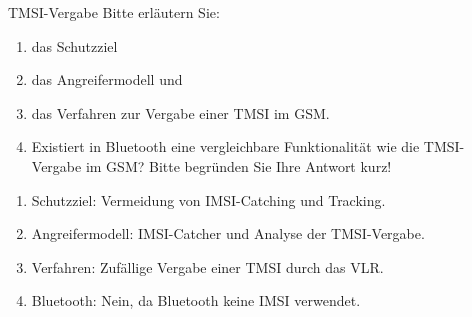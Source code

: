\documentclass{article}
\begin{document}
\begin{exercise}{TMSI-Vergabe}
  Bitte erläutern Sie:
  \begin{enumerate}
    \item das Schutzziel
    \item das Angreifermodell und
    \item das Verfahren zur Vergabe einer TMSI im GSM.
    \item Existiert in Bluetooth eine vergleichbare Funktionalität wie die TMSI-Vergabe im GSM? Bitte begründen Sie Ihre Antwort kurz!
  \end{enumerate}

  \begin{solution}
    \begin{enumerate}
      \item Schutzziel: Vermeidung von IMSI-Catching und Tracking.
      \item Angreifermodell: IMSI-Catcher und Analyse der TMSI-Vergabe.
      \item Verfahren: Zufällige Vergabe einer TMSI durch das VLR.
      \item Bluetooth: Nein, da Bluetooth keine IMSI verwendet.
    \end{enumerate}
  \end{solution}
\end{exercise}
\end{document}
